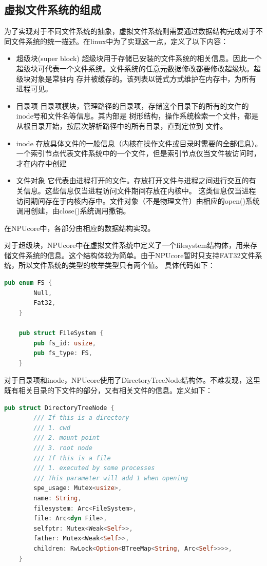 \subsection{虚拟文件系统的组成}

为了实现对于不同文件系统的抽象，虚拟文件系统则需要通过数据结构完成对于不同文件系统的统一描述。在linux中为了实现这一点，定义了以下内容：

\begin{itemize}
	\item {超级块(super block)}
	超级块用于存储已安装的文件系统的相关信息。因此一个超级块可代表一个文件系统。文件系统的任意元数据修改都要修改超级块。超级块对象是常驻内
	存并被缓存的。该列表以链式方式维护在内存中，为所有进程可见。
	\item {目录项}
	目录项模块，管理路径的目录项，存储这个目录下的所有的文件的inode号和文件名等信息。其内部是
	树形结构，操作系统检索一个文件，都是从根目录开始，按层次解析路径中的所有目录，直到定位到
	文件。
	\item {inode}
	存放具体文件的一般信息（内核在操作文件或目录时需要的全部信息）。一个索引节点代表文件系统中的一个文件，但是索引节点仅当文件被访问时，才在内存中创建
	\item {文件对象}
	它代表由进程打开的文件。存放打开文件与进程之间进行交互的有关信息。这些信息仅当进程访问文件期间存放在内核中。
	这类信息仅当进程访问期间存在于内核内存中。文件对象（不是物理文件）由相应的open()系统调用创建，由close()系统调用撤销。
\end{itemize}

在NPUcore中，各部分由相应的数据结构实现。

对于超级块，NPUcore中在虚拟文件系统中定义了一个filesystem结构体，用来存储文件系统的信息。这个结构体较为简单。由于NPUcore暂时只支持FAT32文件系统，所以文件系统的类型的枚举类型只有两个值。
具体代码如下：

\begin{lstlisting}[language={Rust}, label={filesystem},
	caption={filesystem}]
	pub enum FS {
		Null,
		Fat32,
	}
	
	pub struct FileSystem {
		pub fs_id: usize,
		pub fs_type: FS,
	}
\end{lstlisting}

对于目录项和inode，NPUcore使用了DirectoryTreeNode结构体。不难发现，这里既有相关目录的下文件的部分，又有相关文件的信息。定义如下：

\begin{lstlisting}[language={Rust}, label={DirectoryTreeNode},
	caption={DirectoryTreeNode}]
	pub struct DirectoryTreeNode {
		/// If this is a directory
		/// 1. cwd
		/// 2. mount point
		/// 3. root node
		/// If this is a file
		/// 1. executed by some processes
		/// This parameter will add 1 when opening
		spe_usage: Mutex<usize>,
		name: String,
		filesystem: Arc<FileSystem>,
		file: Arc<dyn File>,
		selfptr: Mutex<Weak<Self>>,
		father: Mutex<Weak<Self>>,
		children: RwLock<Option<BTreeMap<String, Arc<Self>>>>,
	}
\end{lstlisting}

